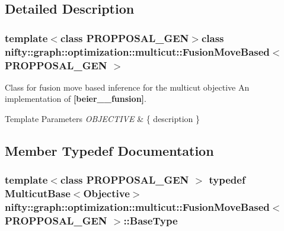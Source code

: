 \subsection{Detailed Description}
\subsubsection*{template$<$class P\+R\+O\+P\+P\+O\+S\+A\+L\+\_\+\+G\+E\+N$>$class nifty\+::graph\+::optimization\+::multicut\+::\+Fusion\+Move\+Based$<$ P\+R\+O\+P\+P\+O\+S\+A\+L\+\_\+\+G\+E\+N $>$}

Class for fusion move based inference for the multicut objective An implementation of {\bfseries [beier\+\_\+\_\+funsion]}. 


\begin{DoxyTemplParams}{Template Parameters}
{\em O\+B\+J\+E\+C\+T\+I\+V\+E} & \{ description \} \\
\hline
\end{DoxyTemplParams}


\subsection{Member Typedef Documentation}
\hypertarget{classnifty_1_1graph_1_1optimization_1_1multicut_1_1FusionMoveBased_addd6a4fdac30fe785caa17acd3204426}{}
\subsubsection[{Base\+Type}]{\setlength{\rightskip}{0pt plus 5cm}template$<$class P\+R\+O\+P\+P\+O\+S\+A\+L\+\_\+\+G\+E\+N $>$ typedef {\bf Multicut\+Base}$<${\bf Objective}$>$ {\bf nifty\+::graph\+::optimization\+::multicut\+::\+Fusion\+Move\+Based}$<$ P\+R\+O\+P\+P\+O\+S\+A\+L\+\_\+\+G\+E\+N $>$\+::{\bf Base\+Type}}\label{classnifty_1_1graph_1_1optimization_1_1multicut_1_1FusionMoveBased_addd6a4fdac30fe785caa17acd3204426}
\hypertarget{classnifty_1_1graph_1_1optimization_1_1multicut_1_1FusionMoveBased_a17407f5e0b37f72271d8a55bf81bb773}{}
